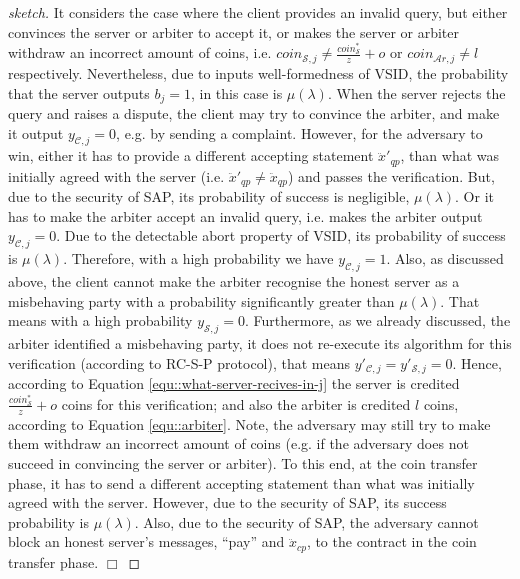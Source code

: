 \begin{proof}[sketch]
       It considers the case where the client provides an invalid query, but  either convinces the server or arbiter to accept it, or  makes the server or arbiter  withdraw an incorrect amount of coins, i.e. $coin_{\scriptscriptstyle\mathcal{S},j}\neq \frac{coin_{\scriptscriptstyle\mathcal S}^{\scriptscriptstyle*}}{z}+o$ or  $coin_{\scriptscriptstyle\mathcal{A}r,j}\neq l$ respectively. Nevertheless, due to inputs well-formedness of VSID, the probability that the server outputs $b_{\scriptscriptstyle j}=1$, in this case is $\mu(\lambda)$. When the server rejects the query and raises a dispute, the client may try to convince the arbiter, and make it output $y_{\scriptscriptstyle \mathcal {C},j}=0$, e.g. by sending a complaint. However, for the adversary to win, either it has to provide a different accepting statement $\ddot{x}'_{\scriptscriptstyle qp}$, than what was initially agreed with the server (i.e. $\ddot{x}'_{\scriptscriptstyle qp}\neq \ddot{x}_{\scriptscriptstyle qp}$) and passes the verification. But,  due to the security of SAP, its probability of success is negligible, $\mu(\lambda)$. Or it has to make the arbiter  accept an invalid query, i.e. makes the arbiter output $y_{\scriptscriptstyle\mathcal{C},j}=0$. Due to the detectable abort property of VSID, its probability of success is  $\mu(\lambda)$. Therefore, with a high probability we have $y_{\scriptscriptstyle\mathcal{C},j}=1$. Also, as discussed above, the client cannot make the arbiter recognise the  honest server as a misbehaving party with a probability significantly greater than $\mu(\lambda)$. That means with a high probability $y_{\scriptscriptstyle\mathcal{S},j}=0$. Furthermore, as we already discussed, the arbiter 
identified a misbehaving party, it does not re-execute its algorithm for this verification (according to RC-S-P protocol),
that means $y'_{\scriptscriptstyle\mathcal{C},j}=y'_{\scriptscriptstyle\mathcal{S},j}=0$.  Hence, according to Equation \ref{equ::what-server-recives-in-j} the server is credited  $\frac{coin_{\scriptscriptstyle\mathcal S}^{\scriptscriptstyle*}}{z}+o$ coins for this verification; and also the arbiter is credited $l$ coins, according to Equation \ref{equ::arbiter}.  Note,  the adversary may still try to  make them withdraw an incorrect amount of coins (e.g. if the adversary does not succeed in convincing the server or arbiter). To this end, at the coin transfer phase, it has to send a  different accepting statement  than what was initially agreed with the server. However, due to the security of SAP, its  success probability is  $\mu(\lambda)$. Also, due to the security of SAP, the adversary cannot block an honest server's  messages, ``pay'' and $\ddot{x}_{\scriptscriptstyle cp}$, to the contract in the coin transfer phase.
 \hfill\(\Box\)\end{proof}
  
